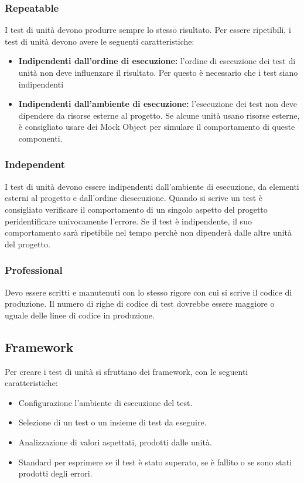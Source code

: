 \subsubsection{Repeatable}
I test di unità devono produrre sempre lo stesso risultato.
Per essere ripetibili, i test di unità devono avere le seguenti caratteristiche:
\begin{itemize}
    \item \textbf{Indipendenti dall'ordine di esecuzione:} l'ordine di esecuzione dei test di unità non deve influenzare il risultato. Per questo è necessario che i test siano indipendenti
    \item \textbf{Indipendenti dall'ambiente di esecuzione:} l'esecuzione dei test non deve dipendere da risorse esterne al progetto. Se alcune unità usano risorse esterne, è consigliato usare dei Mock Object per simulare il comportamento di queste componenti.
\end{itemize}

\subsubsection{Independent}
I test di unità devono essere indipendenti dall'ambiente di esecuzione, da elementi esterni al progetto e dall'ordine diesecuzione. Quando si scrive un test è consigliato verificare il comportamento di un singolo aspetto del progetto peridentificare univocamente l'errore. Se il test è indipendente, il suo comportamento sarà ripetibile nel tempo perchè non dipenderà dalle altre unità del progetto.

\subsubsection{Professional}
Devo essere scritti e manutenuti con lo stesso rigore con cui si scrive il codice di produzione. Il numero di righe di codice di test dovrebbe essere maggiore o uguale delle linee di codice in produzione.

\subsection{Framework}
Per creare i test di unità si sfruttano dei framework, con le seguenti caratteristiche:
\begin{itemize}
    \item Configurazione l'ambiente di esecuzione del test.
    \item Selezione di un test o un insieme di test da eseguire.
    \item Analizzazione di valori aspettati, prodotti dalle unità.
    \item Standard per esprimere se il test è stato superato, se è fallito o se sono stati prodotti degli errori.
\end{itemize}

